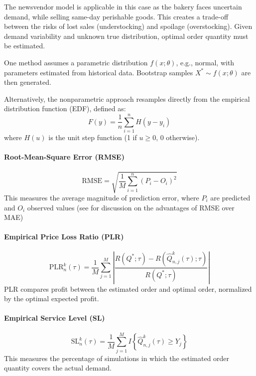 The newsvendor model is applicable in this case as the bakery faces uncertain demand, while selling same-day perishable goods. This creates a trade-off between the risks of lost sales (understocking) and spoilage (overstocking). Given demand variability and unknown true distribution, optimal order quantity must be estimated.

One method assumes a parametric distribution \( f(x; \theta) \), e.g., normal, with parameters estimated from historical data. Bootstrap samples \( X^* \sim f(x; \theta) \) are then generated.

Alternatively, the nonparametric approach resamples directly from the empirical distribution function (EDF), defined as:
\[
F(y) = \frac{1}{n} \sum_{i=1}^{n} H(y - y_i)
\]
where \( H(u) \) is the unit step function (1 if \( u \geq 0 \), 0 otherwise).

\paragraph{Root-Mean-Square Error (RMSE)} 
\[
\text{RMSE} = \sqrt{ \frac{1}{M} \sum_{i=1}^{n} (P_i - O_i)^2 }
\]
This measures the average magnitude of prediction error, where \( P_i \) are predicted and \( O_i \) observed values (see \cite{willmott2005} for discussion on the advantages of RMSE over MAE)

\paragraph{Empirical Price Loss Ratio (PLR)} 
\[
\text{PLR}_n^k(\tau) = \frac{1}{M} \sum_{j=1}^M \left| \frac{R(Q^*; \tau) - R(\hat{Q}_{n,j}^k(\tau); \tau)}{R(Q^*; \tau)} \right|
\]
PLR compares profit between the estimated order and optimal order, normalized by the optimal expected profit.

\paragraph{Empirical Service Level (SL)} 
\[
\text{SL}_n^k(\tau) = \frac{1}{M} \sum_{j=1}^M I\left\{ \hat{Q}_{n,j}^k(\tau) \geq Y_j \right\}
\]
This measures the percentage of simulations in which the estimated order quantity covers the actual demand.

